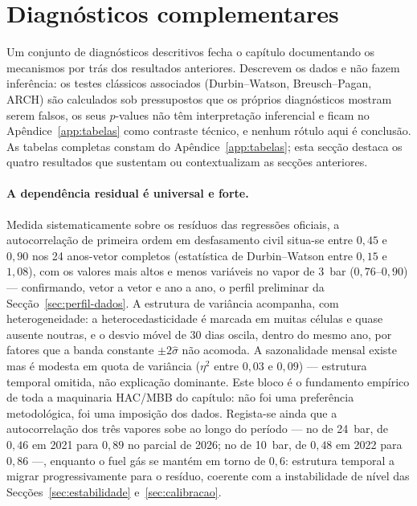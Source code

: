 \section{Diagnósticos complementares}
\label{sec:diagnosticos-desc}


Um conjunto de diagnósticos descritivos fecha o capítulo documentando os
mecanismos por trás dos resultados anteriores. Descrevem os dados e
não fazem inferência: os testes clássicos associados (Durbin--Watson,
Breusch--Pagan, ARCH) são calculados sob pressupostos que os próprios
diagnósticos mostram serem falsos, os seus $p$-values não têm interpretação
inferencial e ficam no Apêndice~\ref{app:tabelas} como contraste técnico, e
nenhum rótulo aqui é conclusão. As tabelas completas constam do Apêndice~\ref{app:tabelas};
esta secção destaca os quatro resultados que sustentam ou contextualizam as
secções anteriores. 

\paragraph{A dependência residual é universal e forte.} Medida
sistematicamente sobre os resíduos das regressões oficiais, a autocorrelação
de primeira ordem em desfasamento civil situa-se entre $0{,}45$ e $0{,}90$
nos 24 anos-vetor completos (estatística de Durbin--Watson entre $0{,}15$ e
$1{,}08$), com os valores mais altos e menos variáveis no vapor de 3~bar
($0{,}76$--$0{,}90$) --- confirmando, vetor a vetor e ano a ano, o perfil
preliminar da Secção~\ref{sec:perfil-dados}. A estrutura de variância acompanha,
com heterogeneidade: a heterocedasticidade é marcada em muitas células e quase
ausente noutras, e o desvio móvel de 30 dias oscila, dentro do mesmo
ano, por fatores que a banda constante $\pm 2\hat\sigma$ não acomoda. A sazonalidade mensal existe mas é
modesta em quota de variância ($\eta^2$ entre $0{,}03$ e $0{,}09$) ---
estrutura temporal omitida, não explicação dominante. Este bloco é o
fundamento empírico de toda a maquinaria HAC/MBB do capítulo: não foi uma
preferência metodológica, foi uma imposição dos dados. Regista-se ainda que
a autocorrelação dos três vapores sobe ao longo do período --- no de
24~bar, de $0{,}46$ em 2021 para $0{,}89$ no parcial de 2026; no de 10~bar,
de $0{,}48$ em 2022 para $0{,}86$ ---, enquanto o fuel gás se mantém em
torno de $0{,}6$: estrutura temporal a migrar progressivamente para o
resíduo, coerente com a instabilidade de nível das
Secções~\ref{sec:estabilidade} e~\ref{sec:calibracao}.


